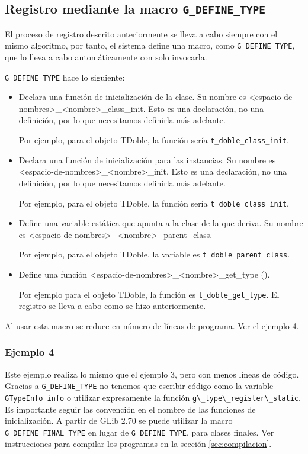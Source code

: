 \subsection{Registro mediante la macro \texttt{G\_DEFINE\_TYPE}}
El proceso de registro descrito anteriormente se lleva a cabo siempre con el mismo algoritmo, por tanto,
el sistema define una macro, como \texttt{G\_DEFINE\_TYPE},  que lo lleva a cabo automáticamente
con solo invocarla.

\texttt{G\_DEFINE\_TYPE} hace lo siguiente:
\begin{itemize}
  \tightlist
\item Declara una función de inicialización de la clase. Su nombre es \textsf{<espacio-de-nombres>\_<nombre>\_class\_init}. Esto es una declaración, no una definición,
  por lo que necesitamos definirla más adelante.

  Por ejemplo, para el objeto \textsf{TDoble}, la función sería \texttt{t\_doble\_class\_init}.
\item Declara una función de inicialización para las instancias. Su nombre es
  \textsf{<espacio-de-nombres>\_<nombre>\_init}.
  Esto es una declaración, no una definición, por lo que necesitamos definirla más adelante.

  Por ejemplo, para el objeto \textsf{TDoble}, la función sería \texttt{t\_doble\_class\_init}.
\item Define una variable estática que apunta a la clase de la que deriva. Su nombre es
  \textsf{<espacio-de-nombres>\_<nombre>\_parent\_class}.
  
  Por ejemplo, para el objeto \textsf{TDoble}, la variable es \texttt{t\_doble\_parent\_class}.
\item Define una función \textsf{<espacio-de-nombres>\_<nombre>\_get\_type ()}.
  
  Por ejemplo para el objeto \textsf{TDoble}, la función es \texttt{t\_doble\_get\_type}.
  El registro se lleva a cabo como se hizo anteriormente.
\end{itemize}

Al usar esta macro se reduce en número de líneas de programa. Ver el ejemplo 4.

\subsubsection{Ejemplo 4}
Este ejemplo realiza lo mismo que el ejemplo 3, pero con menos líneas de código.
Gracias a \texttt{G\_DEFINE\_TYPE} no tenemos que escribir código como la variable \texttt{GTypeInfo info}
o utilizar expresamente la función  \passthrough{\lstinline!g\_type\_register\_static!}.
Es importante seguir las convención en el nombre de las funciones de inicialización.
A partir de \textsf{GLib 2.70} se puede utilizar la macro \texttt{G\_DEFINE\_FINAL\_TYPE} en lugar de
\texttt{G\_DEFINE\_TYPE}, para clases finales.
Ver instrucciones para compilar los programas en la sección \ref{sec:compilacion}.

